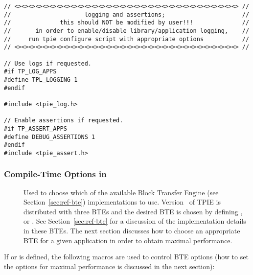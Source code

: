 \begin{verbatim}
// <><><><><><><><><><><><><><><><><><><><><><><><><><><><><><><><> //
//                     logging and assertions;                      //
//              this should NOT be modified by user!!!              //
//       in order to enable/disable library/application logging,    //
//     run tpie configure script with appropriate options           //
// <><><><><><><><><><><><><><><><><><><><><><><><><><><><><><><><> //

// Use logs if requested.
#if TP_LOG_APPS
#define TPL_LOGGING 1
#endif

#include <tpie_log.h>

// Enable assertions if requested.
#if TP_ASSERT_APPS
#define DEBUG_ASSERTIONS 1
#endif
#include <tpie_assert.h>

\end{verbatim}

\subsubsection{Compile-Time Options in }

\begin{description}
    \item[{}] 
    \item[{}]
    \item[{}] Used to choose which of
    the available Block Transfer Engine (see
    Section~\ref{sec:ref-bte}) implementations to use.
    Version \version~of TPIE is distributed with three BTEs
    and the desired BTE is chosen by defining
    ,  or
    . See Section~\ref{sec:ref-bte}
    for a discussion of the implementation details in these
    BTEs. The next section discusses how to choose an
    appropriate BTE for a given application in order to
    obtain maximal performance.

\end{description}

\noindent
If  or  is
defined, the following macros are used to control BTE
options (how to set the options for maximal performance is
discussed in the next section):


